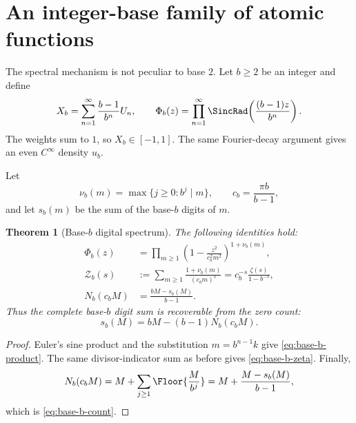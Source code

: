 \documentclass[11pt,oneside]{article}
\newtheorem{theorem}{Theorem}[section]
\theoremstyle{definition}
\theoremstyle{remark}
\begin{document}
\section{An integer-base family of atomic functions}

The spectral mechanism is not peculiar to base \(2\).  Let \(b\geq2\) be an
integer and define
\begin{equation}
 X_b=\sum_{n=1}^{\infty}\frac{b-1}{b^n}U_n,
 \qquad
 \Phi_b(z)=
 \prod_{n=1}^{\infty}
 \SincRad\!\left(\frac{(b-1)z}{b^n}\right).
 \label{eq:base-b}
\end{equation}
The weights sum to \(1\), so \(X_b\in[-1,1]\).  The same Fourier-decay
argument gives an even \(C^\infty\) density \(u_b\).

Let
\[
 \nu_b(m)=\max\{j\geq0:b^j\mid m\},\qquad
 c_b=\frac{\pi b}{b-1},
\]
and let \(s_b(m)\) be the sum of the base-\(b\) digits of \(m\).

\begin{theorem}[Base-\(b\) digital spectrum]
\label{thm:base-b-spectrum}
The following identities hold:
\begin{align}
 \Phi_b(z)
 &=
 \prod_{m\geq1}
 \left(1-\frac{z^2}{c_b^2m^2}\right)^{1+\nu_b(m)},
 \label{eq:base-b-product}\\
 \mathcal Z_b(s)
 &:=
 \sum_{m\geq1}\frac{1+\nu_b(m)}{(c_bm)^s}
 =
 c_b^{-s}\frac{\zeta(s)}{1-b^{-s}},
 \label{eq:base-b-zeta}\\
 N_b(c_bM)
 &=
 \frac{bM-s_b(M)}{b-1}.
 \label{eq:base-b-count}
\end{align}
Thus the complete base-\(b\) digit sum is recoverable from the zero count:
\begin{equation}
 s_b(M)=bM-(b-1)N_b(c_bM).
 \label{eq:digit-recovery}
\end{equation}
\end{theorem}

\begin{proof}
Euler's sine product and the substitution \(m=b^{n-1}k\) give
\eqref{eq:base-b-product}.  The same divisor-indicator sum as before gives
\eqref{eq:base-b-zeta}.  Finally,
\[
 N_b(c_bM)
 =M+\sum_{j\geq1}\Floor{\frac M{b^j}}
 =M+\frac{M-s_b(M)}{b-1},
\]
which is \eqref{eq:base-b-count}.
\end{proof}
\end{document}
